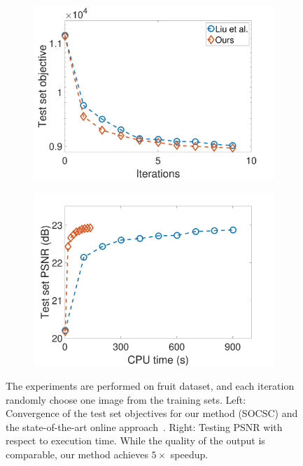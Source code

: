 \begin{figure}[h]
\centering
\begin{subfigure}{0.49\textwidth}
  \includegraphics[width=1\linewidth]{figure/onlineVSliu-ite-fruit.pdf}
\end{subfigure} 
\begin{subfigure}{0.49\textwidth}
  \includegraphics[width=1\linewidth]{figure/onlineVSliu-time-fruit.pdf}
\end{subfigure}

\caption{The experiments are performed on fruit dataset, and each iteration randomly choose one image from the training sets. Left: Convergence of the test set objectives for our method (SOCSC) and the state-of-the-art online approach~\cite{liu-2018-first}. Right: Testing PSNR with respect to execution time. While the quality of the output is comparable, our method achieves $5 \times$ speedup.}
\label{fig:onlineSmall}
\end{figure}

